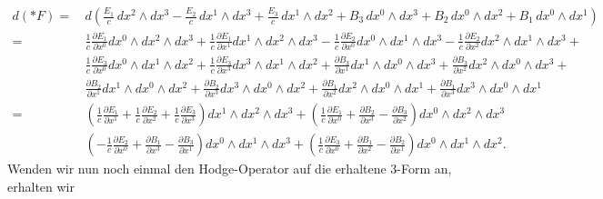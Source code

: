 \begin{align*}
	d(\ast F) = \,
	& d \left(\frac{E_{1}}{c} \, dx^2 \wedge dx^3 -\frac{E_{2}}{c} \, dx^1 \wedge dx^3 + \frac{E_{3}}{c} \, dx^1 \wedge dx^2 + B_3 \, dx^0 \wedge dx^3 + B_2 \, dx^0 \wedge dx^2 + B_1 \, dx^0 \wedge dx^1\right)\\
	=
	& \frac{1}{c}\frac{\partial E_1}{\partial x^0} dx^0 \wedge dx^2 \wedge dx^3 + \frac{1}{c}\frac{\partial E_1}{\partial x^1} dx^1 \wedge dx^2 \wedge dx^3 -
	\frac{1}{c}\frac{\partial E_2}{\partial x^0} dx^0 \wedge dx^1 \wedge dx^3 -
	\frac{1}{c}\frac{\partial E_2}{\partial x^2} dx^2 \wedge dx^1 \wedge dx^3 +\\
	& \frac{1}{c}\frac{\partial E_3}{\partial x^0} dx^0 \wedge dx^1 \wedge dx^2 +
	\frac{1}{c}\frac{\partial E_3}{\partial x^3} dx^3 \wedge dx^1 \wedge dx^2 +
	\frac{\partial B_3}{\partial x^1} dx^1 \wedge dx^0 \wedge dx^3 +
	\frac{\partial B_3}{\partial x^2} dx^2 \wedge dx^0 \wedge dx^3 +\\
	& \frac{\partial B_2}{\partial x^1} dx^1 \wedge dx^0 \wedge dx^2 +
	\frac{\partial B_2}{\partial x^3} dx^3 \wedge dx^0 \wedge dx^2 +
	\frac{\partial B_1}{\partial x^2} dx^2 \wedge dx^0 \wedge dx^1 +
	\frac{\partial B_1}{\partial x^3} dx^3 \wedge dx^0 \wedge dx^1\\
	=
	&\left( \frac{1}{c}\frac{\partial E_1}{\partial x^1} + \frac{1}{c}\frac{\partial E_2}{\partial x^2} + \frac{1}{c}\frac{\partial E_3}{\partial x^3} \right) dx^1 \wedge dx^2 \wedge dx^3 +
	\left(\frac{1}{c}\frac{\partial E_1}{\partial x^0} + \frac{\partial B_2}{\partial x^3} - \frac{\partial B_3}{\partial x^2} \right) dx^0 \wedge dx^2 \wedge dx^3\\
	&\left( -\frac{1}{c}\frac{\partial E_2}{\partial x^0} + \frac{\partial B_1}{\partial x^3} - \frac{\partial B_3}{\partial x^1} \right) dx^0 \wedge dx^1 \wedge dx^3 +
	\left( \frac{1}{c}\frac{\partial E_3}{\partial x^0} + \frac{\partial B_1}{\partial x^2} - \frac{\partial B_2}{\partial x^1} \right) dx^0 \wedge dx^1 \wedge dx^2. 
\end{align*}
Wenden wir nun noch einmal den Hodge-Operator auf die erhaltene 3-Form an, erhalten wir
